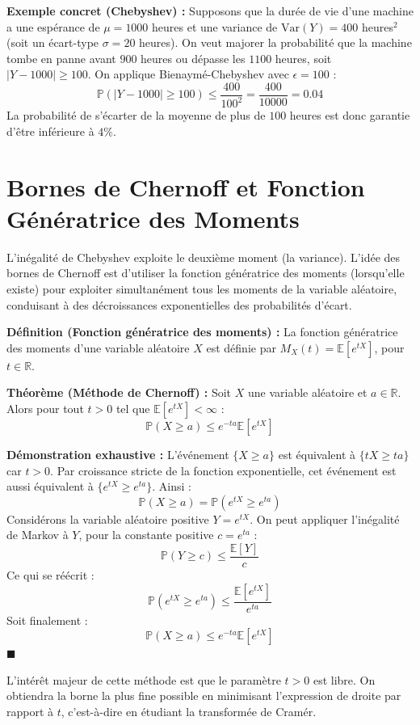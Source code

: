 \documentclass[11pt,a4paper]{article}
\begin{document}
\textbf{Exemple concret (Chebyshev) :}
Supposons que la durée de vie d'une machine a une espérance de $\mu = 1000$ heures et une variance de $\text{Var}(Y) = 400$ heures$^2$ (soit un écart-type $\sigma = 20$ heures).
On veut majorer la probabilité que la machine tombe en panne avant $900$ heures ou dépasse les $1100$ heures, soit $|Y - 1000| \ge 100$.
On applique Bienaymé-Chebyshev avec $\epsilon = 100$ :
$$ \mathbb{P}(|Y - 1000| \ge 100) \le \frac{400}{100^2} = \frac{400}{10000} = 0.04 $$
La probabilité de s'écarter de la moyenne de plus de $100$ heures est donc garantie d'être inférieure à $4\%$.

\section{Bornes de Chernoff et Fonction Génératrice des Moments}

L'inégalité de Chebyshev exploite le deuxième moment (la variance). L'idée des bornes de Chernoff est d'utiliser la fonction génératrice des moments (lorsqu'elle existe) pour exploiter simultanément tous les moments de la variable aléatoire, conduisant à des décroissances exponentielles des probabilités d'écart.

\textbf{Définition (Fonction génératrice des moments) :}
La fonction génératrice des moments d'une variable aléatoire $X$ est définie par $M_X(t) = \mathbb{E}[e^{tX}]$, pour $t \in \mathbb{R}$.

\textbf{Théorème (Méthode de Chernoff) :}
Soit $X$ une variable aléatoire et $a \in \mathbb{R}$. Alors pour tout $t > 0$ tel que $\mathbb{E}[e^{tX}] < \infty$ :
$$ \mathbb{P}(X \ge a) \le e^{-ta} \mathbb{E}[e^{tX}] $$

\textbf{Démonstration exhaustive :}
L'événement $\{X \ge a\}$ est équivalent à $\{tX \ge ta\}$ car $t > 0$.
Par croissance stricte de la fonction exponentielle, cet événement est aussi équivalent à $\{e^{tX} \ge e^{ta}\}$.
Ainsi :
$$ \mathbb{P}(X \ge a) = \mathbb{P}(e^{tX} \ge e^{ta}) $$
Considérons la variable aléatoire positive $Y = e^{tX}$.
On peut appliquer l'inégalité de Markov à $Y$, pour la constante positive $c = e^{ta}$ :
$$ \mathbb{P}(Y \ge c) \le \frac{\mathbb{E}[Y]}{c} $$
Ce qui se réécrit :
$$ \mathbb{P}(e^{tX} \ge e^{ta}) \le \frac{\mathbb{E}[e^{tX}]}{e^{ta}} $$
Soit finalement :
$$ \mathbb{P}(X \ge a) \le e^{-ta} \mathbb{E}[e^{tX}] $$
$\blacksquare$

L'intérêt majeur de cette méthode est que le paramètre $t > 0$ est libre. On obtiendra la borne la plus fine possible en minimisant l'expression de droite par rapport à $t$, c'est-à-dire en étudiant la transformée de Cramér.
\end{document}
